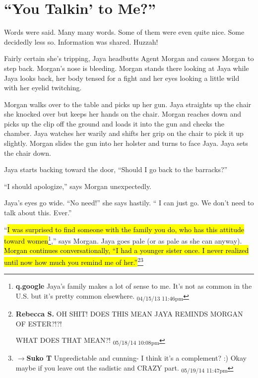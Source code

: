 \setcounter{chapter}{ 18 }
\chapter{\textbf{``You Talkin' to Me?''} }








Words were said.  Many many words.  Some of them were even quite nice.  Some decidedly less so.  Information was shared.  Huzzah!







Fairly certain she's tripping, Jaya headbutts Agent Morgan and causes Morgan to step back.  Morgan's nose is bleeding.  Morgan stands there looking at Jaya while Jaya looks back, her body tensed for a fight and her eyes looking a little wild with her eyelid twitching.



Morgan walks over to the table and picks up her gun.  Jaya straights up the chair she knocked over but keeps her hands on the chair.  Morgan reaches down and picks up the clip off the ground and loads it into the gun and checks the chamber.  Jaya watches her warily and shifts her grip on the chair to pick it up slightly.  Morgan slides the gun into her holster and turns to face Jaya.  Jaya sets the chair down.



Jaya starts backing toward the door, ``Should I go back to the barracks?''

``I should apologize,'' says Morgan unexpectedly.

Jaya's eyes go wide.  ``No need!'' she says hastily. `` I can just go.  We don't need to talk about this.  Ever.''

``\hl{I was surprised to find someone with the family you do, who has this attitude toward women}\footnote{\textbf{q.google }Jaya's family makes a lot of sense to me.  It's not as common in the U.S. but it's pretty common elsewhere. \textsubscript{04/15/13 11:46pm}},'' says Morgan.  Jaya goes pale (or as pale as she can anyway).  \hl{Morgan continues conversationally, ``I had a younger sister once.  I never realized until now how much you remind me of her.''}\footnote{\textbf{Rebecca S. }OH SHIT! 
DOES THIS MEAN JAYA REMINDS MORGAN OF ESTER?!?!

WHAT DOES THAT MEAN?! \textsubscript{05/18/14 10:08pm}}\footnote{$\rightarrow$\textbf{Suko T }Unpredictable and cunning- I think it's a complement? :)  Okay maybe if you leave out the sadistic and CRAZY part. \textsubscript{05/19/14 11:47pm}}

